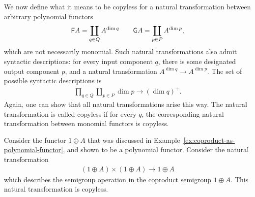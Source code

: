 We now define what it means to be copyless for a natural transformation between arbitrary polynomial functors 
\begin{align*}
\mathsf F A = \coprod_{q \in Q} A^{\dim q} \qquad 
\mathsf G A = \coprod_{p \in P} A^{\dim p},
\end{align*}
which are not necessarily monomial. Such natural transformations also admit syntactic descriptions: for every input component $q$, there is some designated output component $p$, and a natural transformation $A^{\dim q} \to A^{\dim p}$.  The set of possible syntactic descriptions is
\begin{align*}
\prod_{q \in Q} \coprod_{p \in P} \dim p \to (\dim q)^+.
\end{align*}
Again, one can show that all natural transformations arise this way. The natural transformation is called copyless if for every $q$, the corresponding natural transformation between monomial functors is copyless. 


\begin{myexample}\label{ex:copyless-on-coproducts}
    Consider the functor $1 \oplus A$ that was discussed in Example~\ref{ex:coproduct-as-polynomial-functor}, and shown to be a polynomial functor. Consider the natural transformation 
    \begin{align*}
    (1 \oplus A)\times (1 \oplus A) \to 1 \oplus A
    \end{align*}
    which describes the semigroup operation in the coproduct semigroup $1 \oplus A$. This natural transformation is copyless.
\end{myexample}


